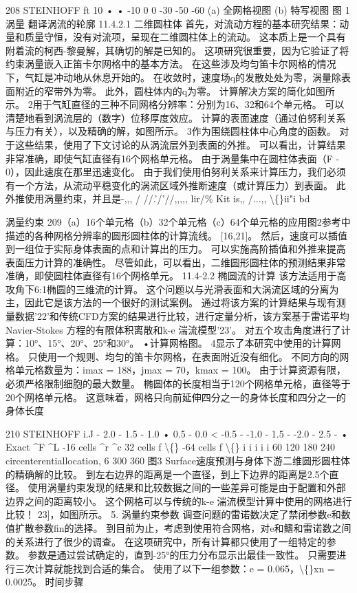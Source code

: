 \documentclass[UTF8,11pt,a4paper,openany,fontset=fandol]{ctexbook}
\begin{document}
208 STEINHOFF ft 10 • • -10 0 0 -30 -50 -60 (a) 全网格视图 (b) 特写视图 图 1 涡量 翻译涡流的轮廓 11.4.2.1 二维圆柱体 首先，对流动方程的基本研究结果：动量和质量守恒，没有对流项，呈现在二维圆柱体上的流动。 这本质上是一个具有附着流的柯西-黎曼解，其确切的解是已知的。 这项研究很重要，因为它验证了将约束涡量嵌入正笛卡尔网格中的基本方法。 在这些涉及均匀笛卡尔网格的情况下，气缸是冲动地从休息开始的。 在收敛时，速度场q的发散处处为零，涡量除表面附近的窄带外为零。 此外，圆柱体内的q为零。 计算解决方案的简化如图所示。 2用于气缸直径的三种不同网格分辨率：分别为16、32和64个单元格。 可以清楚地看到涡流层的（数字）位移厚度效应。 计算的表面速度（通过伯努利关系与压力有关），以及精确的解，如图所示。 3作为围绕圆柱体中心角度的函数。 对于这些结果，使用了下文讨论的从涡流层外到表面的外推。 可以看出，计算结果非常准确，即使气缸直径有16个网格单元格。 由于涡量集中在圆柱体表面（F - 0），因此速度在那里迅速变化。 由于我们使用伯努利关系来计算压力，我们必须有一个方法，从流动平稳变化的涡流区域外推断速度（或计算压力）到表面。 此外推使用涡量约束，并且是-,,, / //.'/'//,,,,, lir/\% Kit is,, /...,, \textbackslash\{\}ii"i bd

涡量约束 209（a）16个单元格（b）32个单元格（c）64个单元格的应用图2参考中描述的各种网格分辨率的圆形圆柱体的计算流线。 [16,21]。 然后，速度可以插值到一组位于实际身体表面的点和计算出的压力。 可以实施高阶插值和外推来提高表面压力计算的准确性。 尽管如此，可以看出，二维圆形圆柱体的预测结果非常准确，即使圆柱体直径有16个网格单元。 11.4-2.2 椭圆流的计算 该方法适用于高攻角下6:1椭圆的三维流的计算。 这个问题以与光滑表面和大涡流区域的分离为主，因此它是该方法的一个很好的测试案例。 通过将该方案的计算结果与现有测量数据'22'和传统CFD方案的结果进行比较，进行定量分析，该方案基于雷诺平均Navier-Stokes 方程的有限体积离散和k-e 湍流模型'23'。 对五个攻击角度进行了计算：10°、15°、20°、25°和30°。 •计算网格图。 4显示了本研究中使用的计算网格。 只使用一个规则、均匀的笛卡尔网格，在表面附近没有细化。 不同方向的网格单元格数量为：imax = 188，jmax = 70，kmax = 100。 由于计算资源有限，必须严格限制细胞的最大数量。 椭圆体的长度相当于120个网格单元格，直径等于20个网格单元格。 这意味着，网格只向前延伸四分之一的身体长度和四分之一的身体长度

210 STEINHOFF i.J - 2.0 - 1.5 - 1.0 • 0.5 - 0.0 < -0.5 - -1.0 - 1.5 - -2.0 - 2.5 - • Exact \textasciicircum{}F \textasciicircum{}L -16 cells \textasciicircum{}r \textasciicircum{}c 32 cells f \textbackslash\{\} -64 cells f \textbackslash\{\} i i i i i 60 120 180 240 circenterentiallocation, 6 300 360 图3 Surface速度预测与身体下游二维圆形圆柱体的精确解的比较。 到左右边界的距离是一个直径，到上下边界的距离是2.5个直径。 使用涡量约束发现的结果和比较数据之间的一些差异可能是由于配置和外部边界之间的距离较小。 这个网格可以与传统的k-e 湍流模型计算中使用的网格进行比较！ 23]，如图所示。 5. 涡量约束参数 调查问题的雷诺数决定了禁闭参数e和数值扩散参数fin的选择。 到目前为止，考虑到使用符合网格，对e和鳍和雷诺数之间的关系进行了很少的调查。 在这项研究中，所有计算都只使用了一组特定的参数。 参数是通过尝试确定的，直到-25°的压力分布显示出最佳一致性。 只需要进行三次计算就能找到合适的集合。 使用了以下一组参数：e = 0.065，\textbackslash\{\}xn = 0.0025。 时间步骤
\end{document}
